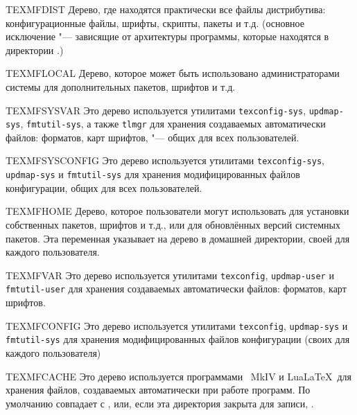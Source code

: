 \documentclass{article}
\begin{document}
\begin{ttdescription}
\item [TEXMFDIST] Дерево, где находятся практически все файлы
  дистрибутива: конфигурационные файлы, шрифты, скрипты, пакеты и
  т.д. (основное исключение "--- зависящие от архитектуры программы,
  которые находятся в директории .)
\item [TEXMFLOCAL] Дерево, которое может быть использовано
  администраторами системы для дополнительных пакетов,
  шрифтов и т.д.
\item [TEXMFSYSVAR] Это дерево используется утилитами
  \verb+texconfig-sys+, \verb+updmap-sys+, \verb+fmtutil-sys+, а также
  \verb+tlmgr+ 
  для хранения создаваемых автоматически файлов:
  форматов, карт шрифтов, "--- общих для всех пользователей.
\item [TEXMFSYSCONFIG] Это дерево используется утилитами
  \verb+texconfig-sys+, \verb+updmap-sys+ и \verb+fmtutil-sys+
   для хранения модифицированных файлов
  конфигурации, общих для всех пользователей.
\item [TEXMFHOME] Дерево, которое пользователи могут использовать для
  установки собственных пакетов, шрифтов и т.д., или для обновлённых
  версий системных пакетов.  Эта переменная указывает на дерево в
  домашней директории, своей для каждого пользователя.
\item [TEXMFVAR] Это дерево используется утилитами \verb+texconfig+,
  \verb+updmap-user+ и \verb+fmtutil-user+  для хранения
  создаваемых автоматически файлов: форматов, карт шрифтов.
\item [TEXMFCONFIG] Это дерево используется утилитами
  \verb+texconfig+, \verb+updmap-sys+ и \verb+fmtutil-sys+ 
  для хранения модифицированных файлов конфигурации (своих для каждого
  пользователя) 
\item [TEXMFCACHE] Это дерево 
  используется программами \ConTeXt\ MkIV и Lua\LaTeX\ для
  хранения файлов, создаваемых автоматически при работе программ.  По
  умолчанию совпадает с , или, если эта директория
  закрыта для записи, .
\end{ttdescription}
\end{document}
